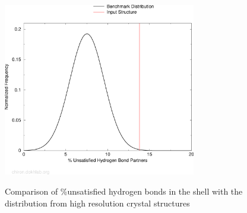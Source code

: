 \documentclass[11pt,twoside,letterpaper]{article}
\begin{document}
\begin{figure}[h!]
	\begin{center}
		\includegraphics[width=0.75\textwidth]{4ins-678-hbond-shell.pdf}\\
		\caption{Comparison of \%unsatisfied hydrogen bonds in the shell with the distribution from high resolution crystal structures}
	\end{center}
\end{figure}
\end{document}
